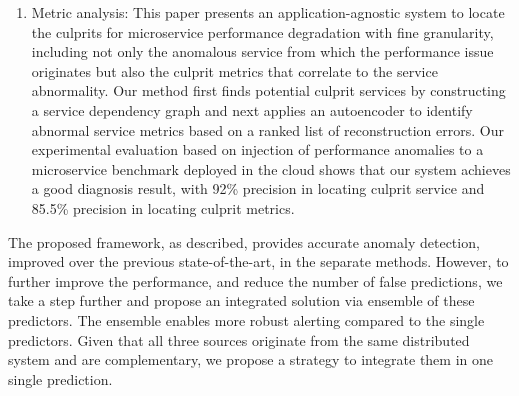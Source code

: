 \begin{enumerate}
    \item Metric analysis:
     This paper presents an application-agnostic system to locate the culprits for microservice performance degradation with fine granularity, including not only the anomalous service from which the performance issue originates but also the culprit metrics that correlate to the service abnormality. Our method first finds potential culprit services by constructing a service dependency graph and next applies an autoencoder to identify abnormal service metrics based on a ranked list of reconstruction errors. Our experimental evaluation based on injection of performance anomalies to a microservice benchmark deployed in the cloud shows that our system achieves a good diagnosis result, with 92\% precision in locating culprit service and 85.5\% precision in locating culprit metrics.
\end{enumerate}

The proposed framework, as described, provides accurate anomaly detection, improved over the previous state-of-the-art, in the separate methods. However, to further improve the performance, and reduce the number of false predictions, we take a step further and propose an integrated solution via ensemble of these predictors. The ensemble enables more robust alerting compared to the single predictors. Given that all three sources originate from the same distributed system and are complementary, we propose a strategy to integrate them in one single prediction.

